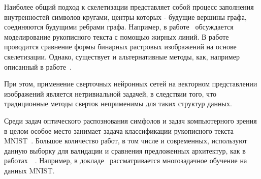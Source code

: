 \documentclass[12pt, twoside]{article}
\begin{document}
Наиболее общий подход к скелетизации представляет собой процесс заполнения внутренностей символов кругами, центры которых - будущие вершины графа, соединяются будущими ребрами графа. Например, в работе~\cite{graphs_gen} обсуждается моделирование рукописного текста с помощью жирных линий. В работе~\cite{graphs_shape_comp} проводится сравнение формы бинарных растровых изображений на основе скелетизации. Однако, существует и альтернативные методы, как, например описанный в работе~\cite{graphs_alt_method}. 

При этом, применение сверточных нейронных сетей на векторном представлении изображений является нетривиальной задачей, в следствии того, что традиционные методы сверток неприменимы для таких структур данных. 

Среди задач оптического распознования симфолов и задач компьютерного зрения в целом особое место занимает задача классификации рукописного текста MNIST~\cite{mnist_original}. Большое количество работ, в том числе и современных, используют данную выборку для валидации и сравнения предложенных архитектур, как в работах~\cite{mnist_sample1}~\cite{mnist_sample2}. Например, в докладе~\cite{mnist_sample3} рассматривается многозадачное обучение на данных MNIST.
\end{document}
